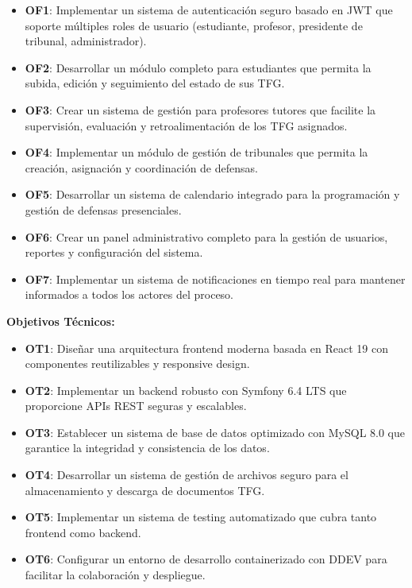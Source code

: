 \documentclass[12pt,a4paper,oneside]{report}
\providecommand{\tightlist}{%
  \setlength{\itemsep}{0pt}\setlength{\parskip}{0pt}}
\begin{document}
\begin{itemize}
\tightlist
\item
  \textbf{OF1}: Implementar un sistema de autenticación seguro basado en
  JWT que soporte múltiples roles de usuario (estudiante, profesor,
  presidente de tribunal, administrador).
\item
  \textbf{OF2}: Desarrollar un módulo completo para estudiantes que
  permita la subida, edición y seguimiento del estado de sus TFG.
\item
  \textbf{OF3}: Crear un sistema de gestión para profesores tutores que
  facilite la supervisión, evaluación y retroalimentación de los TFG
  asignados.
\item
  \textbf{OF4}: Implementar un módulo de gestión de tribunales que
  permita la creación, asignación y coordinación de defensas.
\item
  \textbf{OF5}: Desarrollar un sistema de calendario integrado para la
  programación y gestión de defensas presenciales.
\item
  \textbf{OF6}: Crear un panel administrativo completo para la gestión
  de usuarios, reportes y configuración del sistema.
\item
  \textbf{OF7}: Implementar un sistema de notificaciones en tiempo real
  para mantener informados a todos los actores del proceso.
\end{itemize}

\textbf{Objetivos Técnicos:}

\begin{itemize}
\tightlist
\item
  \textbf{OT1}: Diseñar una arquitectura frontend moderna basada en
  React 19 con componentes reutilizables y responsive design.
\item
  \textbf{OT2}: Implementar un backend robusto con Symfony 6.4 LTS que
  proporcione APIs REST seguras y escalables.
\item
  \textbf{OT3}: Establecer un sistema de base de datos optimizado con
  MySQL 8.0 que garantice la integridad y consistencia de los datos.
\item
  \textbf{OT4}: Desarrollar un sistema de gestión de archivos seguro
  para el almacenamiento y descarga de documentos TFG.
\item
  \textbf{OT5}: Implementar un sistema de testing automatizado que cubra
  tanto frontend como backend.
\item
  \textbf{OT6}: Configurar un entorno de desarrollo containerizado con
  DDEV para facilitar la colaboración y despliegue.
\end{itemize}
\end{document}
